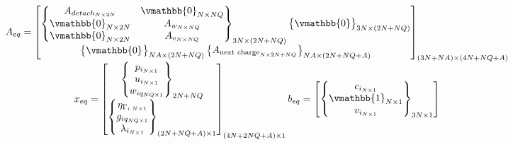 \documentclass[letterpaper, 10pt, conference]{IEEEtran}
\begin{document}
\begin{equation}
\begin{array}{c}
A_{eq} =
\begin{bmatrix}
    \begin{Bmatrix}
	A_{detach_{N \times 2N}}    & \vmathbb{0}_{N \times NQ} \\
	\vmathbb{0}_{N \times 2N} & A_{w_{N \times NQ}}          \\
	\vmathbb{0}_{N \times 2N} & A_{v_{N \times NQ}}          \\
    \end{Bmatrix}_{3N \times (2N + NQ)}
    \begin{Bmatrix}
	\vmathbb{0}
    \end{Bmatrix}_{3N \times (2N + NQ)} \\
    \begin{Bmatrix}
	\vmathbb{0}_{}
    \end{Bmatrix}_{NA \times (2N + NQ)}
    \begin{Bmatrix}
	A_{\textrm{next charge}_{N \times 2N + NQ}}
    \end{Bmatrix}_{NA \times (2N + NQ + A)} \\
\end{bmatrix}_{(3N + NA) \times (4N + NQ + A)} \\
x_{eq} =
\begin{bmatrix}
    \begin{Bmatrix}
	p_{i_{N \times 1}} \\
	u_{i_{N \times 1}} \\
	w_{iq_{NQ \times 1}} \\
    \end{Bmatrix}_{2N + NQ} \\
    \begin{Bmatrix}
	\eta_{\Gamma_{i\; N \times 1}} \\
	g_{iq_{NQ \times 1}}           \\
	\lambda_{i_{N \times 1}}       \\
    \end{Bmatrix}_{(2N + NQ + A) \times 1}
\end{bmatrix}_{(4N + 2NQ + A) \times 1}
b_{eq} =
\begin{bmatrix}
    \begin{Bmatrix}
	c_{i_{N \times 1}} \\
	\vmathbb{1}_{N \times 1} \\
	v_{i_{N \times 1}} \\
    \end{Bmatrix}_{3N \times 1} \\

\end{bmatrix}
\end{array}
\end{equation}
\end{document}
